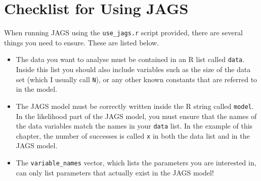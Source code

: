 \section{Checklist for Using JAGS}
When running JAGS using the {\tt use\_jags.r} script provided, there are several
things you need to ensure. These are listed below.

\begin{itemize}
\item The data you want to analyse must be contained in an R
list called {\tt data}. Inside this list you should also include variables
such as the size of the data set (which I usually call {\tt N}),
or any other known constants that are
referred to in the model.
\item The JAGS model must be correctly written inside the R string called
{\tt model}. In the likelihood part of the JAGS model, you must ensure that
the names of the data variables match the names in your {\tt data} list. In
the example of this chapter, the number of successes is called {\tt x} in both
the data list and in the JAGS model.
\item The {\tt variable\_names} vector, which lists the parameters you are
interested in, can only list parameters that actually exist in the JAGS model!
\end{itemize}
